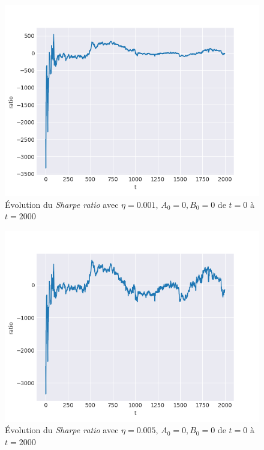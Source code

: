 \documentclass[a4paper, 11pt]{article}
\begin{document}
 
 \begin{figure}[H]
 	\centering
 	\includegraphics[]{res/exemple_eta_0001}
 	\caption[Blup]{Évolution du \textit{Sharpe ratio} avec $\eta = 0.001$, $A_0 = 0, B_0 = 0$ de $t=0$ à $t=2000$}
 	\label{sharpe ratio eta=0.0001}
 \end{figure}
 
 \begin{figure}[H]
 	\centering
 	\includegraphics[]{res/exemple_eta_0005}
 	\caption[Blup]{Évolution du \textit{Sharpe ratio} avec $\eta = 0.005$, $A_0 = 0, B_0 = 0$ de $t=0$ à $t=2000$}
 	\label{sharpe ratio eta=0.0005}
 \end{figure}
 
\end{document}
